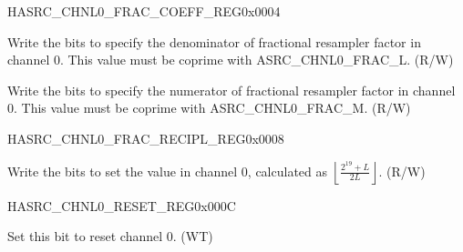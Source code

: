 \begin{register}{H}{ASRC\_CHNL0\_FRAC\_COEFF\_REG}{0x0004}\label{regdesc:ASRCCHNL0FRACCOEFFREG}
%
%
%
\regnewline%
\begin{regdesc}\begin{reglist}
\label{fielddesc:ASRCCHNL0FRACM}\item [ASRC\_CHNL0\_FRAC\_M] Write the bits to specify the denominator of fractional resampler factor in channel 0. This value must be coprime with ASRC\_CHNL0\_FRAC\_L. (R/W)
\label{fielddesc:ASRCCHNL0FRACL}\item [ASRC\_CHNL0\_FRAC\_L] Write the bits to specify the numerator of fractional resampler factor in channel 0. This value must be coprime with ASRC\_CHNL0\_FRAC\_M. (R/W)
\end{reglist}\end{regdesc}
\end{register}


\begin{register}{H}{ASRC\_CHNL0\_FRAC\_RECIPL\_REG}{0x0008}\label{regdesc:ASRCCHNL0FRACRECIPLREG}
%
%
\regnewline%
\begin{regdesc}\begin{reglist}
\label{fielddesc:ASRCCHNL0FRACRECIPL}\item [ASRC\_CHNL0\_FRAC\_RECIPL] Write the bits to set the value in channel 0, calculated as \(\left\lfloor \frac{2^{19} + L}{2L} \right\rfloor\). (R/W)
\end{reglist}\end{regdesc}
\end{register}


\begin{register}{H}{ASRC\_CHNL0\_RESET\_REG}{0x000C}\label{regdesc:ASRCCHNL0RESETREG}
%
%
\regnewline%
\begin{regdesc}\begin{reglist}
\label{fielddesc:ASRCCHNL0RESET}\item [ASRC\_CHNL0\_RESET] Set this bit to reset channel 0. (WT)
\end{reglist}\end{regdesc}
\end{register}


